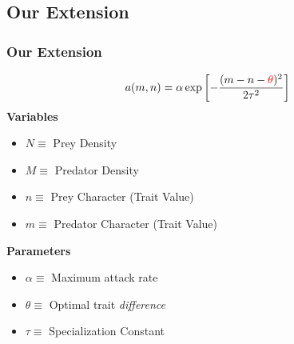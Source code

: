 \documentclass[10pt]{beamer}
\begin{document}
\subsection{Our Extension}
\begin{frame}
	\frametitle{Our Extension}
	\begin{align*}
		a(m, n) = \alpha \exp\left[-\frac{(m - n - {\color{red} \theta})^2}{2\tau^2}\right]
	\end{align*}
	{\bf Variables}
	\begin{itemize}
		\item $N \equiv $ Prey Density
		\item $M \equiv $ Predator Density
		\item $n \equiv $ Prey Character (Trait Value)
		\item $m \equiv $ Predator Character (Trait Value)
	\end{itemize}
	{\bf Parameters}
	\begin{itemize}
		\item $\alpha \equiv $ Maximum attack rate
		\item $\theta \equiv $ Optimal trait {\color{red}\it difference}
		\item $\tau \equiv $ Specialization Constant
	\end{itemize}
\end{frame}
\end{document}
